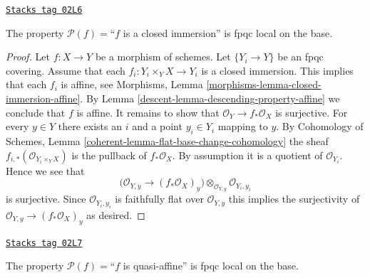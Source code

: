 \begin{lemma}
\label{descent-lemma-descending-property-closed-immersion}
\href{https://stacks.math.columbia.edu/tag/02L6}{\texttt{Stacks tag 02L6}}

The property $\mathcal{P}(f) =$``$f$ is a closed immersion''
is fpqc local on the base.
\end{lemma}

\begin{proof}

Let $f : X \to Y$ be a morphism of schemes.
Let $\{Y_i \to Y\}$ be an fpqc covering.
Assume that each $f_i : Y_i \times_Y X \to Y_i$
is a closed immersion.
This implies that each $f_i$ is affine, see
Morphisms, Lemma \ref{morphisms-lemma-closed-immersion-affine}.
By Lemma \ref{descent-lemma-descending-property-affine}
we conclude that $f$ is affine. It remains to show that
$\mathcal{O}_Y \to f_*\mathcal{O}_X$ is surjective.
For every $y \in Y$ there exists an $i$ and a point
$y_i \in Y_i$ mapping to $y$.
By Cohomology of Schemes, Lemma \ref{coherent-lemma-flat-base-change-cohomology}
the sheaf $f_{i, *}(\mathcal{O}_{Y_i \times_Y X})$
is the pullback of $f_*\mathcal{O}_X$.
By assumption it is a quotient of $\mathcal{O}_{Y_i}$.
Hence we see that
$$
\Big(
\mathcal{O}_{Y, y} \longrightarrow (f_*\mathcal{O}_X)_y
\Big)
\otimes_{\mathcal{O}_{Y, y}} \mathcal{O}_{Y_i, y_i}
$$
is surjective. Since $\mathcal{O}_{Y_i, y_i}$ is faithfully
flat over $\mathcal{O}_{Y, y}$ this implies the surjectivity
of $\mathcal{O}_{Y, y} \longrightarrow (f_*\mathcal{O}_X)_y$ as
desired.
\end{proof}

\begin{lemma}
\label{descent-lemma-descending-property-quasi-affine}
\href{https://stacks.math.columbia.edu/tag/02L7}{\texttt{Stacks tag 02L7}}

The property $\mathcal{P}(f) =$``$f$ is quasi-affine''
is fpqc local on the base.
\end{lemma}

